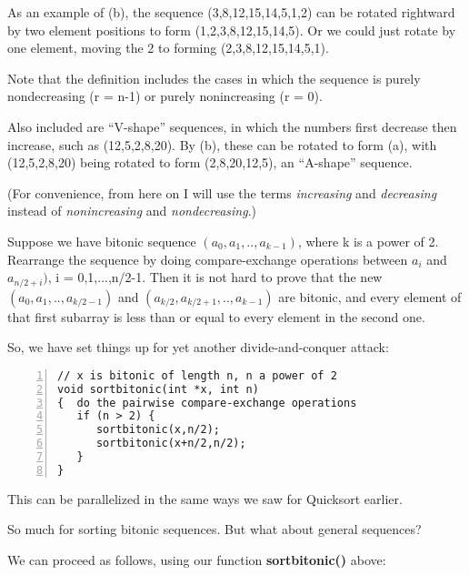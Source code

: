 As an example of (b), the sequence (3,8,12,15,14,5,1,2) can be rotated
rightward by two element positions to form (1,2,3,8,12,15,14,5).  Or we
could just rotate by one element, moving the 2 to forming
(2,3,8,12,15,14,5,1).

Note that the definition includes the cases in which the sequence is
purely nondecreasing (r = n-1) or purely nonincreasing (r = 0).  

Also included are ``V-shape'' sequences, in which the numbers first
decrease then increase, such as (12,5,2,8,20).  By (b), these can be
rotated to form (a), with (12,5,2,8,20) being rotated to form
(2,8,20,12,5), an ``A-shape'' sequence.

(For convenience, from here on I will use the terms {\it increasing} and
{\it decreasing} instead of {\it nonincreasing} and {\it
nondecreasing}.)

Suppose we have bitonic sequence $(a_0, a_1,.., a_{k-1})$, where k is a
power of 2.  Rearrange the sequence by doing compare-exchange operations
between $a_i$ and $a_{n/2+i})$, i = 0,1,...,n/2-1.  Then it is not hard
to prove that the new $(a_0, a_1,.., a_{k/2-1})$ and $(a_{k/2},
a_{k/2+1},.., a_{k-1})$ are bitonic, and every element of that first
subarray is less than or equal to every element in the second one.  

So, we have set things up for yet another divide-and-conquer attack:

\begin{Verbatim}[fontsize=\relsize{-2},numbers=left]
// x is bitonic of length n, n a power of 2
void sortbitonic(int *x, int n)
{  do the pairwise compare-exchange operations
   if (n > 2) {
      sortbitonic(x,n/2);
      sortbitonic(x+n/2,n/2);
   }
}
\end{Verbatim}

This can be parallelized in the same ways we saw for Quicksort earlier.

So much for sorting bitonic sequences.  But what about general
sequences?  

We can proceed as follows, using our function {\bf sortbitonic()} above:

